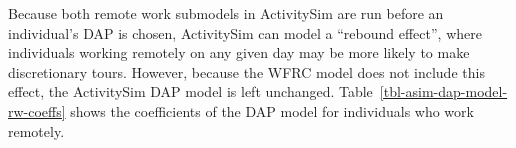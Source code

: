 \documentclass[fancy, oneside, mastersfancy, ms]{byuthesis}
\begin{document}
\begin{table}

\caption{\label{tbl-baseline-telecommute}Telecommute Rates and
Coefficients by Job Industry}


\end{table}%

Because both remote work submodels in ActivitySim are run before an
individual's DAP is chosen, ActivitySim can model a ``rebound effect'',
where individuals working remotely on any given day may be more likely
to make discretionary tours. However, because the WFRC model does not
include this effect, the ActivitySim DAP model is left unchanged.
Table~\ref{tbl-asim-dap-model-rw-coeffs} shows the coefficients of the
DAP model for individuals who work remotely.
\end{document}
